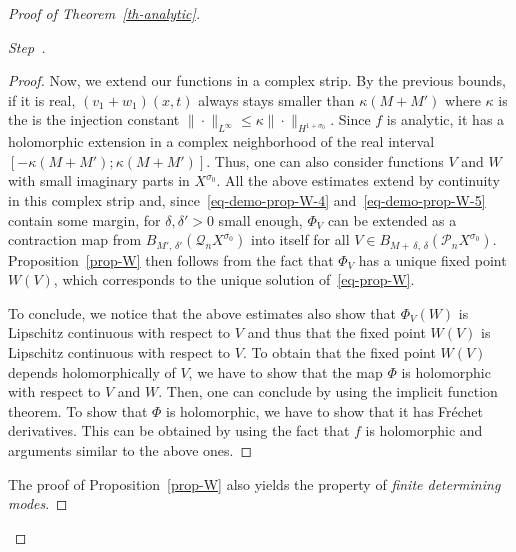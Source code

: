 \documentclass[10pt]{amsart}
\theoremstyle{definition}\newtheorem{defi}[theo]{Definition}\newtheorem{rema}[theo]{Remark}\newtheorem{exam}[theo]{Example}\newtheorem{exem}[theo]{Example}\newtheorem{nota}[theo]{Notation}
\newcommand{\Pc}{\mathcal{P}}
\newcommand{\Qc}{\mathcal{Q}}
\newcounter{stepcount}
\newenvironment{step}{\refstepcounter{stepcount}\begin{proof}[Step~\thestepcount]}{\let\qed\relax\end{proof}}
\begin{document}
\begin{proof}[{Proof of Theorem~\ref{th-analytic}}]
\begin{step}
\begin{proof}
Now, we extend our functions in a complex strip. By the previous bounds, if it is real, $(v_1+w_1)(x,t)$ always stays smaller than $\kappa(M+M')$ where $\kappa$ is the is the injection constant $\|\cdot\|_{L^\infty}\leq \kappa
\|\cdot\|_{H^{1+\sigma_0}}$. Since $f$ is analytic, it has a holomorphic extension in a complex neighborhood of the real interval $[-\kappa(M+M');\kappa(M+M')]$. Thus, one can also consider functions $V$ and $W$ with small imaginary parts in $X^{\sigma_0}$. All the above estimates extend by continuity in this complex strip and, since~\eqref{eq-demo-prop-W-4} and~\eqref{eq-demo-prop-W-5} contain some margin, for $\delta,\delta'>0$ small enough, $\Phi_V$ can be extended as a contraction map from $B_{M',\,\delta'}(\Qc_nX^{\sigma_0})$ into itself for all $V\in B_{M+\,\delta,\,\delta}(\Pc_nX^{\sigma_0})$. Proposition~\ref{prop-W} then follows from the fact that $\Phi_V$ has a unique fixed point $W(V)$, which corresponds to the unique solution of~\eqref{eq-prop-W}.

To conclude, we notice that the above estimates also show that $\Phi_V(W)$ is Lipschitz continuous with respect to $V$ and thus that the fixed point $W(V)$ is Lipschitz continuous with respect to $V$. To obtain that the fixed point $W(V)$ depends holomorphically of $V$, we have to show that the map $\Phi$ is holomorphic with respect to $V$ and $W$. Then, one can conclude by using the implicit function theorem. To show that $\Phi$ is holomorphic, we have to show that it has Fréchet derivatives. This can be obtained by using the fact that $f$ is holomorphic and arguments similar to the above ones.
\end{proof}


The proof of Proposition~\ref{prop-W} also yields the property of \emph{finite determining modes}.


\end{step}
\end{proof}
\end{document}
